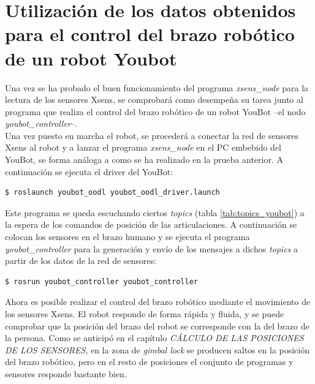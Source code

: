 \documentclass[12pt, a4paper]{report}
\begin{document}

\section{Utilización de los datos obtenidos para el control del brazo robótico de un robot Youbot}

Una vez se ha probado el buen funcionamiento del programa \textit{xsens\_node} para la lectura de los sensores Xsens, se comprobará como desempeña su tarea junto al programa que realiza el control del brazo robótico de un robot YouBot --el nodo \textit{youbot\_controller}--. \\

Una vez puesto en marcha el robot, se procederá a conectar la red de sensores Xsens al robot y a lanzar el programa \textit{xsens\_node} en el PC embebido del YouBot, se forma análoga a como se ha realizado en la prueba anterior. A continuación se ejecuta el driver del YouBot:

\begin{verbatim}
$ roslaunch youbot_oodl youbot_oodl_driver.launch
\end{verbatim}

Este programa se queda escuchando ciertos \textit{topics} (tabla \ref{tab:topics_youbot}) a la espera de los comandos de posición de las articulaciones. A continuación se colocan los sensores en el brazo humano y se ejecuta el programa \textit{youbot\_controller} para la generación y envío de los mensajes a dichos \textit{topics} a partir de los datos de la red de sensores:

\begin{verbatim}
$ rosrun youbot_controller youbot_controller
\end{verbatim}

Ahora es posible realizar el control del brazo robótico mediante el movimiento de los sensores Xsens. El robot responde de forma rápida y fluida, y se puede comprobar que la posición del brazo del robot se corresponde con la del brazo de la persona. Como se anticipó en el capítulo \textit{CÁLCULO DE LAS POSICIONES DE LOS SENSORES}, en la zona de \textit{gimbal lock} se producen saltos en la posición del brazo robótico, pero en el resto de posiciones el conjunto de programas y sensores responde bastante bien.
\end{document}
